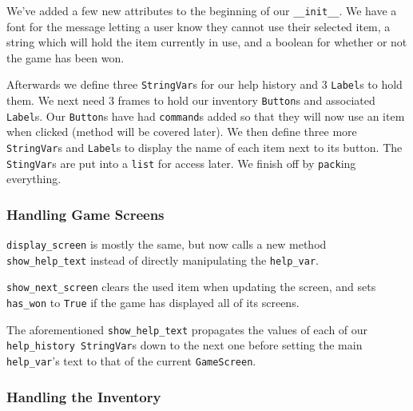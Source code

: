 \documentclass[a4paper,11pt,openany]{book}
\begin{document}
We've added a few new attributes to the beginning of our \lstinline[columns=fixed]{__init__}. We have a font for the message letting a user know they cannot use their selected item, a string which will hold the item currently in use, and a boolean for whether or not the game has been won.

\vspace{5mm}

Afterwards we define three \lstinline[columns=fixed]{StringVar}s for our help history and 3 \lstinline[columns=fixed]{Label}s to hold them. We next need 3 frames to hold our inventory \lstinline[columns=fixed]{Button}s and associated \lstinline[columns=fixed]{Label}s. Our \lstinline[columns=fixed]{Button}s have had \lstinline[columns=fixed]{command}s added so that they will now use an item when clicked (method will be covered later). We then define three more \lstinline[columns=fixed]{StringVar}s and \lstinline[columns=fixed]{Label}s to display the name of each item next to its button. The \lstinline[columns=fixed]{StingVar}s are put into a \lstinline[columns=fixed]{list} for access later. We finish off by \lstinline[columns=fixed]{pack}ing everything. 

\subsubsection{Handling Game Screens}

\lstinline[columns=fixed]{display_screen} is mostly the same, but now calls a new method \lstinline[columns=fixed]{show_help_text} instead of directly manipulating the \lstinline[columns=fixed]{help_var}.

\vspace{5mm}

\lstinline[columns=fixed]{show_next_screen} clears the used item when updating the screen, and sets \lstinline[columns=fixed]{has_won} to \lstinline[columns=fixed]{True} if the game has displayed all of its screens. 

\vspace{5mm}

The aforementioned \lstinline[columns=fixed]{show_help_text} propagates the values of each of our \lstinline[columns=fixed]{help_history StringVar}s down to the next one before setting the main \lstinline[columns=fixed]{help_var}'s text to that of the current \lstinline[columns=fixed]{GameScreen}.

\subsubsection{Handling the Inventory}
\end{document}
